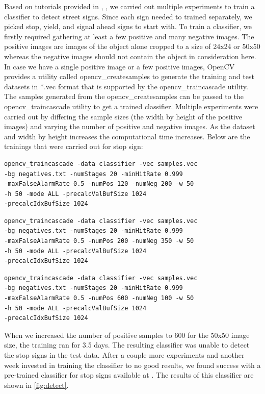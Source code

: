 \documentclass[9pt,twocolumn,twoside]{../../styles/osajnl}
\begin{document}
Based on tutorials provided in \cite{www-coding-robin},
\cite{www-opencv} , we carried out multiple experiments to train a
classifier to detect street signs. Since each sign needed to trained
separately, we picked stop, yield, and signal ahead signs to start
with. To train a classifier, we firstly required gathering at least a
few positive and many negative images. The positive images are images
of the object alone cropped to a size of 24x24 or 50x50 whereas the
negative images should not contain the object in consideration
here. In case we have a single positive image or a few positive
images, OpenCV provides a utility called opencv\_createsamples to
generate the training and test datasets in *.vec format that is
supported by the opencv\_traincascade utility. The samples generated
from the opencv\_createsamples can be passed to the
opencv\_traincascade utility to get a trained classifier.  Multiple
experiments were carried out by differing the sample sizes (the width
by height of the positive images) and varying the number of positive
and negative images. As the dataset and width by height increases the
computational time increases. Below are the trainings that were
carried out for stop sign:

\begin{verbatim}
opencv_traincascade -data classifier -vec samples.vec 
-bg negatives.txt -numStages 20 -minHitRate 0.999 
-maxFalseAlarmRate 0.5 -numPos 120 -numNeg 200 -w 50 
-h 50 -mode ALL -precalcValBufSize 1024
-precalcIdxBufSize 1024
\end{verbatim}
\begin{verbatim}
opencv_traincascade -data classifier -vec samples.vec 
-bg negatives.txt -numStages 20 -minHitRate 0.999 
-maxFalseAlarmRate 0.5 -numPos 200 -numNeg 350 -w 50 
-h 50 -mode ALL -precalcValBufSize 1024
-precalcIdxBufSize 1024
\end{verbatim}
\begin{verbatim}
opencv_traincascade -data classifier -vec samples.vec 
-bg negatives.txt -numStages 20 -minHitRate 0.999 
-maxFalseAlarmRate 0.5 -numPos 600 -numNeg 100 -w 50 
-h 50 -mode ALL -precalcValBufSize 1024
-precalcIdxBufSize 1024
\end{verbatim}

When we increased the number of positive samples to 600 for the 50x50
image size, the training ran for 3.5 days. The resulting classifier
was unable to detect the stop signs in the test data. After a couple
more experiments and another week invested in training the classifier
to no good results, we found success with a pre-trained classifier for
stop signs available at \cite{github-stopsigns}. The results of this
classifier are shown in \ref{fig:detect}.
\end{document}
